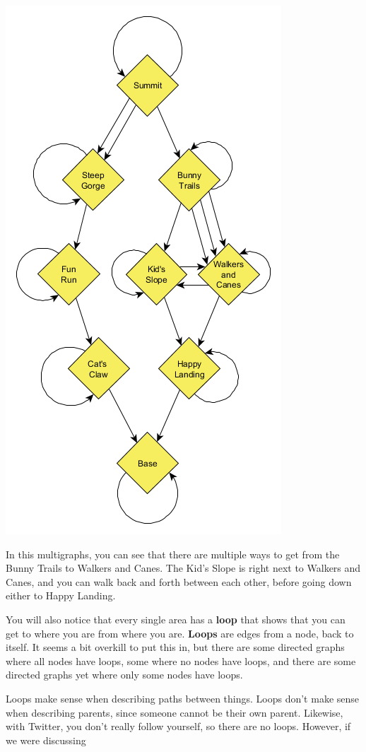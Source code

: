 \includegraphics{01/slopes.png}

In this multigraphs, you can see that there are multiple ways to get from the Bunny Trails to Walkers and Canes. The Kid's Slope is right next to Walkers and Canes, and you can walk back and forth between each other, before going down either to Happy Landing.

You will also notice that every single area has a \textbf{loop} that shows that you can get to where you are from where you are. \textbf{Loops} are edges from a node, back to itself. It seems a bit overkill to put this in, but there are some directed graphs where all nodes have loops, some where no nodes have loops, and there are some directed graphs yet where only some nodes have loops.

Loops make sense when describing paths between things. Loops don't make sense when describing parents, since someone cannot be their own parent. Likewise, with Twitter, you don't really follow yourself, so there are no loops. However, if we were discussing 

